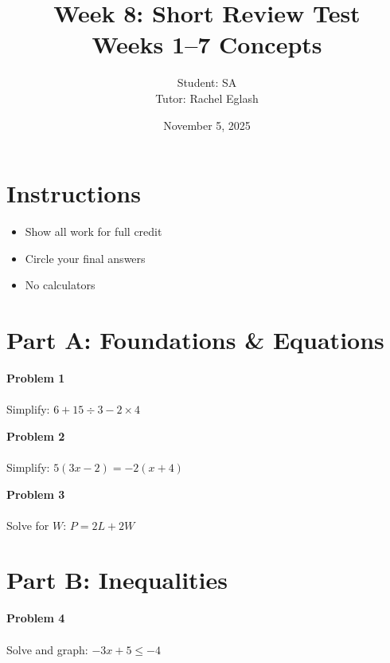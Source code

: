 \documentclass[12pt]{article}
\title{Week 8: Short Review Test\\Weeks 1--7 Concepts}
\author{
	Student: SA\\
	Tutor: Rachel Eglash}
\date{November 5, 2025}
\begin{document}
	
	\maketitle

	\section*{Instructions}
        
        \begin{itemize}
            \item Show all work for full credit
            \item Circle your final answers
            \item No calculators
        \end{itemize}
	    
        \newpage
	
        \section*{Part A: Foundations \& Equations}

            \textbf{Problem 1}\\\\
            Simplify: $6 + 15 \div 3 - 2 \times 4$

            \vspace{3cm}

            \textbf{Problem 2}\\\\
            Simplify: $5(3x - 2) = - 2(x + 4)$

            \vspace{3cm}

            \textbf{Problem 3}\\\\
            Solve for $W$: $\displaystyle P = 2L + 2W$

            \newpage

        \section*{Part B: Inequalities}

            \textbf{Problem 4}\\\\
            Solve and graph: $-3x + 5 \leq -4$

            \vspace{3cm}
\end{document}
